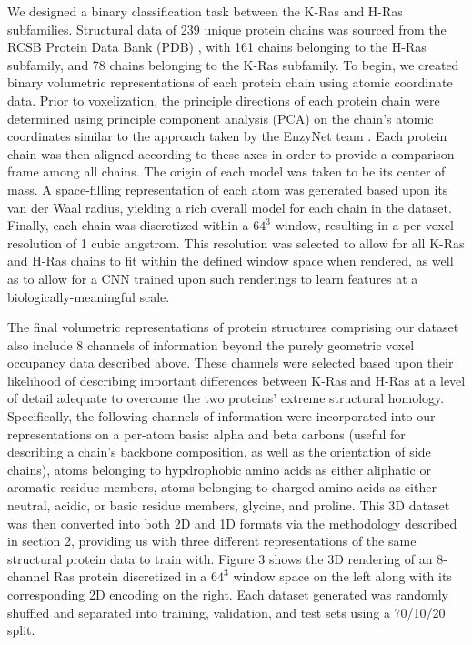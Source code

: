 \documentclass{article}
\begin{document}
We designed a binary classification task between the K-Ras and H-Ras subfamilies. Structural data of 239 unique protein chains was sourced from the RCSB Protein Data Bank (PDB) \cite{doi:10.1093/nar/28.1.235}, with 161 chains belonging to the H-Ras subfamily, and 78 chains belonging to the K-Ras subfamily. To begin, we created binary volumetric representations of each protein chain using atomic coordinate data. Prior to voxelization, the principle directions of each protein chain were determined using principle component analysis (PCA) on the chain's atomic coordinates similar to the approach taken by the EnzyNet team \cite{2017arXiv170706017A}. Each protein chain was then aligned according to these axes in order to provide a comparison frame among all chains. The origin of each model was taken to be its center of mass. A space-filling representation of each atom was generated based upon its van der Waal radius, yielding a rich overall model for each chain in the dataset. Finally, each chain was discretized within a $64^3$ window, resulting in a per-voxel resolution of 1 cubic angstrom. This resolution was selected to allow for all K-Ras and H-Ras chains to fit within the defined window space when rendered, as well as to allow for a CNN trained upon such renderings to learn features at a biologically-meaningful scale.

The final volumetric representations of protein structures comprising our dataset also include 8 channels of information beyond the purely geometric voxel occupancy data described above. These channels were selected based upon their likelihood of describing important differences between K-Ras and H-Ras at a level of detail adequate to overcome the two proteins' extreme structural homology. Specifically, the following channels of information were incorporated into our representations on a per-atom basis: alpha and beta carbons (useful for describing a chain's backbone composition, as well as the orientation of side chains), atoms belonging to hypdrophobic amino acids as either aliphatic or aromatic residue members, atoms belonging to charged amino acids as either neutral, acidic, or basic residue members, glycine, and proline. This 3D dataset was then converted into both 2D and 1D formats via the methodology described in section 2, providing us with three different representations of the same structural protein data to train with. Figure 3 shows the 3D rendering of an 8-channel Ras protein discretized in a $64^3$ window space on the left along with its corresponding 2D encoding on the right. Each dataset generated was randomly shuffled and separated into training, validation, and test sets using a 70/10/20 split. 
\end{document}
